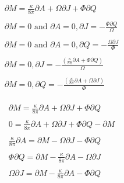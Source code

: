 \begin{equation*}
\displaystyle \begin{array}{lll}\\
 \displaystyle  \partial M = \frac{\kappa}{8 \pi} \partial A + \Omega \partial J + \Phi \partial Q \\\\
 \displaystyle  \partial M = 0 \text{ and } \partial A = 0, \partial J = - \frac{\Phi \partial Q}{\Omega} \\\\
 \displaystyle  \partial M = 0 \text{ and } \partial A = 0, \partial Q = - \frac{\Omega \partial J}{\Phi} \\\\
 \displaystyle  \partial M = 0, \partial J = -\frac{(\frac{\kappa}{8 \pi} \partial A + \Phi \partial Q)}{\Omega} \\\\
 \displaystyle  \partial M = 0, \partial Q = -\frac{(\frac{\kappa}{8 \pi} \partial A + \Omega \partial J)}{\Phi}  \\\\
\end{array}
\end{equation*}
\begin{equation*}
\displaystyle \begin{array}{lll}\\
 \displaystyle  \partial M = \frac{\kappa}{8 \pi} \partial A + \Omega \partial J + \Phi \partial Q \\\\
 \displaystyle  0 = \frac{\kappa}{8 \pi} \partial A + \Omega \partial J + \Phi \partial Q - \partial M \\\\
 \displaystyle  \frac{\kappa}{8 \pi} \partial A = \partial M - \Omega \partial J - \Phi \partial Q \\\\
 \displaystyle  \Phi \partial Q = \partial M - \frac{\kappa}{8 \pi} \partial A - \Omega \partial J \\\\
 \displaystyle  \Omega \partial J = \partial M - \frac{\kappa}{8 \pi} \partial A - \Phi \partial Q \\\\
\end{array}
\end{equation*}

